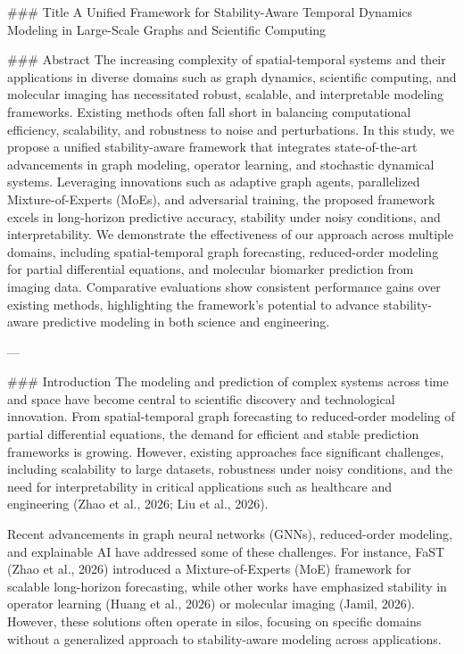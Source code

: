 ### Title
A Unified Framework for Stability-Aware Temporal Dynamics Modeling in Large-Scale Graphs and Scientific Computing

### Abstract
The increasing complexity of spatial-temporal systems and their applications in diverse domains such as graph dynamics, scientific computing, and molecular imaging has necessitated robust, scalable, and interpretable modeling frameworks. Existing methods often fall short in balancing computational efficiency, scalability, and robustness to noise and perturbations. In this study, we propose a unified stability-aware framework that integrates state-of-the-art advancements in graph modeling, operator learning, and stochastic dynamical systems. Leveraging innovations such as adaptive graph agents, parallelized Mixture-of-Experts (MoEs), and adversarial training, the proposed framework excels in long-horizon predictive accuracy, stability under noisy conditions, and interpretability. We demonstrate the effectiveness of our approach across multiple domains, including spatial-temporal graph forecasting, reduced-order modeling for partial differential equations, and molecular biomarker prediction from imaging data. Comparative evaluations show consistent performance gains over existing methods, highlighting the framework's potential to advance stability-aware predictive modeling in both science and engineering.

---

### Introduction
The modeling and prediction of complex systems across time and space have become central to scientific discovery and technological innovation. From spatial-temporal graph forecasting to reduced-order modeling of partial differential equations, the demand for efficient and stable prediction frameworks is growing. However, existing approaches face significant challenges, including scalability to large datasets, robustness under noisy conditions, and the need for interpretability in critical applications such as healthcare and engineering (Zhao et al., 2026; Liu et al., 2026).

Recent advancements in graph neural networks (GNNs), reduced-order modeling, and explainable AI have addressed some of these challenges. For instance, FaST (Zhao et al., 2026) introduced a Mixture-of-Experts (MoE) framework for scalable long-horizon forecasting, while other works have emphasized stability in operator learning (Huang et al., 2026) or molecular imaging (Jamil, 2026). However, these solutions often operate in silos, focusing on specific domains without a generalized approach to stability-aware modeling across applications.

